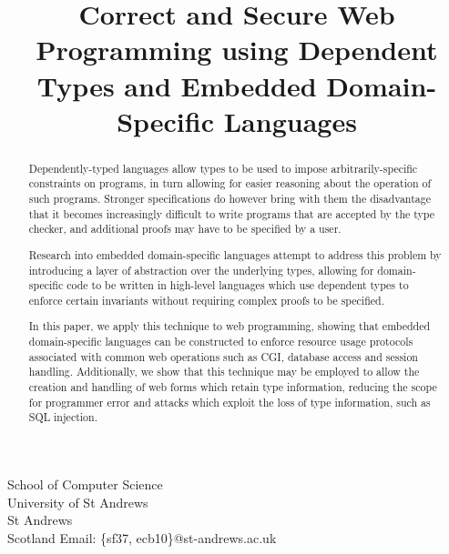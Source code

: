 \documentclass[preprint]{sigplanconf}
\begin{document}
\newcommand{\idris}{\textsc{Idris}}
\setlength{\pdfpageheight}{\paperheight}
\setlength{\pdfpagewidth}{\paperwidth}





\preprintfooter{}   %

\title{Correct and Secure Web Programming using Dependent Types and Embedded Domain-Specific Languages}

           {School of Computer Science \\ University of St Andrews \\ St Andrews \\ Scotland}
           {Email: \{sf37, ecb10\}@st-andrews.ac.uk}

\maketitle

\begin{abstract}
Dependently-typed languages allow types to be used to impose arbitrarily-specific constraints on programs, in turn allowing for easier reasoning about the operation of such programs. Stronger specifications do however bring with them the disadvantage that it becomes increasingly difficult to write programs that are accepted by the type checker, and additional proofs may have to be specified by a user.

Research into embedded domain-specific languages attempt to address this problem by introducing a layer of abstraction over the underlying types, allowing for domain-specific code to be written in high-level languages which use dependent types to enforce certain invariants without requiring complex proofs to be specified.

In this paper, we apply this technique to web programming, showing that embedded domain-specific languages can be constructed to enforce resource usage protocols associated with common web operations such as CGI, database access and session handling. Additionally, we show that this technique may be employed to allow the creation and handling of web forms which retain type information, reducing the scope for programmer error and attacks which exploit the loss of type information, such as SQL injection.
\end{abstract}
\end{document}
